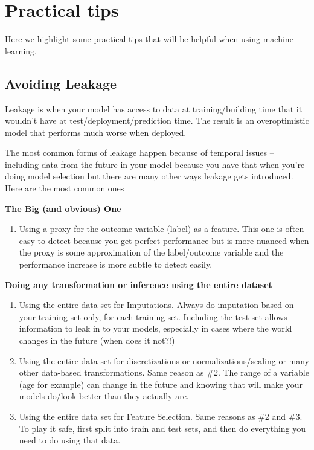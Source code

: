 \documentclass[]{krantz}
\providecommand{\tightlist}{%
  \setlength{\itemsep}{0pt}\setlength{\parskip}{0pt}}
\begin{document}
\section{Practical tips}\label{practical-tips}

Here we highlight some practical tips that will be helpful when using
machine learning.

\subsection{Avoiding Leakage}\label{avoiding-leakage}

Leakage is when your model has access to data at training/building time
that it wouldn't have at test/deployment/prediction time. The result is
an overoptimistic model that performs much worse when deployed.

The most common forms of leakage happen because of temporal issues --
including data from the future in your model because you have that when
you're doing model selection but there are many other ways leakage gets
introduced. Here are the most common ones

\textbf{The Big (and obvious) One}

\begin{enumerate}
\def\labelenumi{\arabic{enumi}.}
\tightlist
\item
  Using a proxy for the outcome variable (label) as a feature. This one
  is often easy to detect because you get perfect performance but is
  more nuanced when the proxy is some approximation of the label/outcome
  variable and the performance increase is more subtle to detect easily.
\end{enumerate}

\textbf{Doing any transformation or inference using the entire dataset}

\begin{enumerate}
\def\labelenumi{\arabic{enumi}.}
\setcounter{enumi}{1}
\item
  Using the entire data set for Imputations. Always do imputation based
  on your training set only, for each training set. Including the test
  set allows information to leak in to your models, especially in cases
  where the world changes in the future (when does it not?!)
\item
  Using the entire data set for discretizations or
  normalizations/scaling or many other data-based transformations. Same
  reason as \#2. The range of a variable (age for example) can change in
  the future and knowing that will make your models do/look better than
  they actually are.
\item
  Using the entire data set for Feature Selection. Same reasons as \#2
  and \#3. To play it safe, first split into train and test sets, and
  then do everything you need to do using that data.
\end{enumerate}
\end{document}
